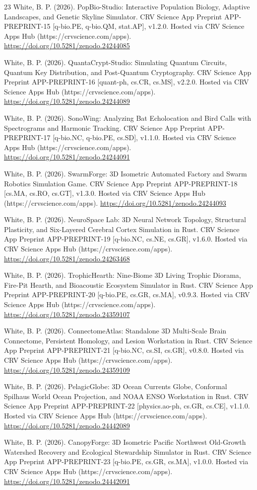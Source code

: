 \documentclass[10pt,letterpaper]{article}
\begin{document}
\begin{thebibliography}{23}
 White, B. P. (2026). PopBio-Studio: Interactive Population Biology, Adaptive Landscapes, and Genetic Skyline Simulator. CRV Science App Preprint APP-PREPRINT-15 [q-bio.PE, q-bio.QM, stat.AP], v1.2.0. Hosted via CRV Science Apps Hub (https://crvscience.com/apps). \url{https://doi.org/10.5281/zenodo.24244085}

 White, B. P. (2026). QuantaCrypt-Studio: Simulating Quantum Circuits, Quantum Key Distribution, and Post-Quantum Cryptography. CRV Science App Preprint APP-PREPRINT-16 [quant-ph, cs.CR, cs.MS], v2.2.0. Hosted via CRV Science Apps Hub (https://crvscience.com/apps). \url{https://doi.org/10.5281/zenodo.24244089}

 White, B. P. (2026). SonoWing: Analyzing Bat Echolocation and Bird Calls with Spectrograms and Harmonic Tracking. CRV Science App Preprint APP-PREPRINT-17 [q-bio.NC, q-bio.PE, cs.SD], v1.1.0. Hosted via CRV Science Apps Hub (https://crvscience.com/apps). \url{https://doi.org/10.5281/zenodo.24244091}

 White, B. P. (2026). SwarmForge: 3D Isometric Automated Factory and Swarm Robotics Simulation Game. CRV Science App Preprint APP-PREPRINT-18 [cs.MA, cs.RO, cs.GT], v1.3.0. Hosted via CRV Science Apps Hub (https://crvscience.com/apps). \url{https://doi.org/10.5281/zenodo.24244093}

 White, B. P. (2026). NeuroSpace Lab: 3D Neural Network Topology, Structural Plasticity, and Six-Layered Cerebral Cortex Simulation in Rust. CRV Science App Preprint APP-PREPRINT-19 [q-bio.NC, cs.NE, cs.GR], v1.6.0. Hosted via CRV Science Apps Hub (https://crvscience.com/apps). \url{https://doi.org/10.5281/zenodo.24263468}

 White, B. P. (2026). TrophicHearth: Nine-Biome 3D Living Trophic Diorama, Fire-Pit Hearth, and Bioacoustic Ecosystem Simulator in Rust. CRV Science App Preprint APP-PREPRINT-20 [q-bio.PE, cs.GR, cs.MA], v0.9.3. Hosted via CRV Science Apps Hub (https://crvscience.com/apps). \url{https://doi.org/10.5281/zenodo.24359107}

 White, B. P. (2026). ConnectomeAtlas: Standalone 3D Multi-Scale Brain Connectome, Persistent Homology, and Lesion Workstation in Rust. CRV Science App Preprint APP-PREPRINT-21 [q-bio.NC, cs.SI, cs.GR], v0.8.0. Hosted via CRV Science Apps Hub (https://crvscience.com/apps). \url{https://doi.org/10.5281/zenodo.24359109}

 White, B. P. (2026). PelagicGlobe: 3D Ocean Currents Globe, Conformal Spilhaus World Ocean Projection, and NOAA ENSO Workstation in Rust. CRV Science App Preprint APP-PREPRINT-22 [physics.ao-ph, cs.GR, cs.CE], v1.1.0. Hosted via CRV Science Apps Hub (https://crvscience.com/apps). \url{https://doi.org/10.5281/zenodo.24442089}

 White, B. P. (2026). CanopyForge: 3D Isometric Pacific Northwest Old-Growth Watershed Recovery and Ecological Stewardship Simulator in Rust. CRV Science App Preprint APP-PREPRINT-23 [q-bio.PE, cs.GR, cs.MA], v1.0.0. Hosted via CRV Science Apps Hub (https://crvscience.com/apps). \url{https://doi.org/10.5281/zenodo.24442091}
\end{thebibliography}
\end{document}
